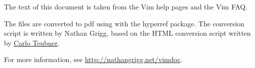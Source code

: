 \begin{minipage}{5in}
The text of this document is taken from the Vim
help pages and the Vim FAQ.

\bigskip

The files are converted to pdf using \engine with the hyperref package.
The conversion script
is written by Nathan Grigg, based on the HTML conversion script written
by \href{http://github.com/c4rlo/vimhelp/}{Carlo Teubner}.

\bigskip

For more information, see \href{http://nathangrigg.net/vimdoc}{http://nathangrigg.net/vimdoc}.
\end{minipage}
